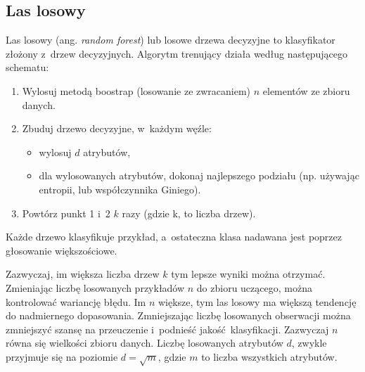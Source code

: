\subsection{Las losowy}
Las losowy (ang. \textit{random forest}) lub losowe drzewa decyzyjne \cite{randomFc} to klasyfikator złożony z~drzew decyzyjnych. Algorytm trenujący działa według następującego schematu:
\begin{enumerate}
	\item Wylosuj metodą boostrap (losowanie ze zwracaniem) $n$ elementów ze zbioru danych.
	\item Zbuduj drzewo decyzyjne, w~każdym węźle:
	\begin{itemize}
		\item wylosuj $d$ atrybutów,
		\item dla wylosowanych atrybutów, dokonaj najlepszego podziału (np. używając entropii, lub współczynnika Giniego).
	\end{itemize}
	\item Powtórz punkt 1 i~2 $k$ razy (gdzie k, to liczba drzew).
\end{enumerate}
Każde drzewo klasyfikuje przykład, a~ostateczna klasa nadawana jest poprzez głosowanie większościowe. \par
Zazwyczaj, im większa liczba drzew $k$ tym lepsze wyniki można otrzymać. Zmieniając liczbę losowanych przykładów $n$ do zbioru uczącego, można kontrolować wariancję błędu. Im $n$ większe, tym las losowy ma większą tendencję do nadmiernego dopasowania. Zmniejszając liczbę losowanych obserwacji można zmniejszyć szansę na przeuczenie i~podnieść jakość klasyfikacji. Zazwyczaj $n$ równa się wielkości zbioru danych. Liczbę losowanych atrybutów $d$, zwykle przyjmuje się na poziomie $d = \sqrt{m}$, gdzie $m$ to liczba wszystkich atrybutów.
